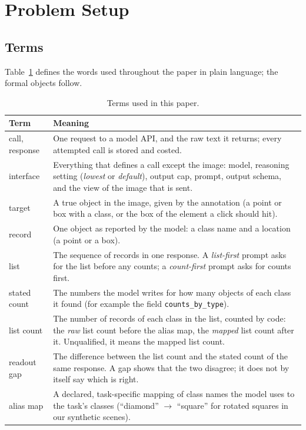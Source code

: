 \section{Problem Setup}\label{sec:setup}

\subsection{Terms}\label{sec:setup:terms}
Table~\ref{tab:terms} defines the words used throughout the paper in plain language; the formal objects follow.

\begin{table}[tp]
\centering\footnotesize\setlength{\tabcolsep}{4pt}\renewcommand{\arraystretch}{0.97}
\caption{Terms used in this paper.}\label{tab:terms}
\begin{tabular}{@{}>{\raggedright\arraybackslash}p{2.6cm}>{\raggedright\arraybackslash}p{12.8cm}@{}}\toprule
Term & Meaning \\\midrule
call, response & One request to a model API, and the raw text it returns; every attempted call is stored and costed. \\
interface & Everything that defines a call except the image: model, reasoning setting (\emph{lowest} or \emph{default}), output cap, prompt, output schema, and the view of the image that is sent. \\
target & A true object in the image, given by the annotation (a point or box with a class, or the box of the element a click should hit). \\
record & One object as reported by the model: a class name and a location (a point or a box). \\
list & The sequence of records in one response. A \emph{list-first} prompt asks for the list before any counts; a \emph{count-first} prompt asks for counts first. \\
stated count & The numbers the model writes for how many objects of each class it found (for example the field \texttt{counts\_by\_type}). \\
list count & The number of records of each class in the list, counted by code: the \emph{raw} list count before the alias map, the \emph{mapped} list count after it. Unqualified, it means the mapped list count. \\
readout gap & The difference between the list count and the stated count of the same response. A gap shows that the two disagree; it does not by itself say which is right. \\
alias map & A declared, task-specific mapping of class names the model uses to the task's classes (``diamond'' $\to$ ``square'' for rotated squares in our synthetic scenes). \\

\end{tabular}
\end{table}
